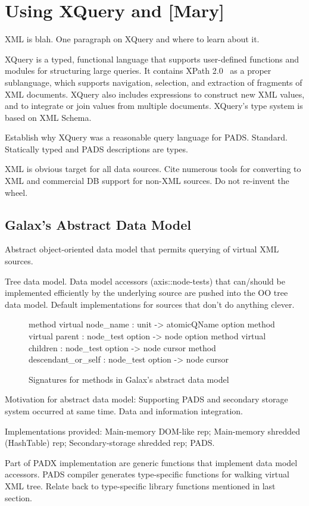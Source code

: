 \section{Using XQuery and \Galax{}[Mary]}
\label{section:galax}

XML is blah. One paragraph on XQuery and where to learn about it.

XQuery is a typed, functional language that supports user-defined
functions and modules for structuring large queries.  It contains
XPath 2.0~\cite{xpath} as a proper sublanguage, which supports
navigation, selection, and extraction of fragments of XML documents.
XQuery also includes expressions to construct new XML values, and to
integrate or join values from multiple documents.  XQuery's type
system is based on XML Schema. 

Establish why XQuery was a reasonable query language for PADS.
Standard.  Statically typed and PADS descriptions are types.  

XML is obvious target for all data sources.  Cite numerous
tools for converting to XML and commercial DB support for non-XML
sources.  Do not re-invent the wheel.

\subsection{Galax's Abstract Data Model}

Abstract object-oriented data model that permits querying of virtual
XML sources.  

Tree data model.  Data model accessors (axis::node-tests) that can/should be implemented
efficiently by the underlying source are pushed into the OO tree data
model.  Default implementations for sources that don't do anything
clever.   
\begin{figure}
\begin{small}
\begin{code}
  method virtual node_name  : unit -> atomicQName option
  method virtual parent     : node_test option -> node option
  method virtual children   : node_test option -> node cursor
  method descendant_or_self : node_test option -> node cursor
\end{code}
\end{small}
\caption{Signatures for methods in Galax's abstract data model}
\end{figure}

Motivation for abstract data model: Supporting PADS and secondary
storage system occurred at same time.  Data and information
integration.  

Implementations provided: Main-memory DOM-like rep; Main-memory
shredded (HashTable) rep; Secondary-storage shredded rep; PADS.

Part of PADX implementation are generic functions that implement data
model accessors.  PADS compiler generates type-specific functions for
walking virtual XML tree.  Relate back to type-specific library
functions mentioned in last section.

